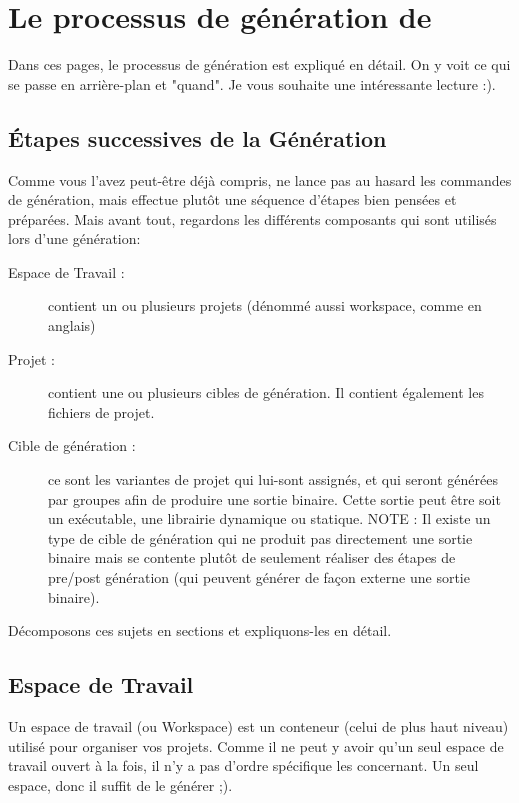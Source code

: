 \section{Le processus de génération de \codeblocks}\label{sec:build_process}

Dans ces pages, le processus de génération est expliqué en détail. On y voit ce qui se passe en arrière-plan et "quand". Je vous souhaite une intéressante lecture :).
 
\subsection{Étapes successives de la Génération}

Comme vous l'avez peut-être déjà compris, \codeblocks ne lance pas au hasard les commandes de génération, mais effectue plutôt une séquence d'étapes bien pensées et préparées. Mais avant tout, regardons les différents composants qui sont utilisés lors d'une génération:

\begin{description}
\item [Espace de Travail :] contient un ou plusieurs projets (dénommé aussi workspace, comme en anglais)
\item [Projet :] contient une ou plusieurs cibles de génération. Il contient également les fichiers de projet.
\item [Cible de génération :] ce sont les variantes de projet qui lui-sont assignés, et qui seront générées par groupes afin de produire une sortie binaire. Cette sortie peut être soit un exécutable, une librairie  dynamique ou statique. NOTE : Il existe un type de cible de génération qui ne produit pas directement une sortie binaire mais se contente plutôt de seulement réaliser des étapes de pre/post génération (qui peuvent générer de façon externe une sortie binaire).
\end{description}

Décomposons ces sujets en sections et expliquons-les en détail.

\subsection{Espace de Travail}

Un espace de travail (ou Workspace) est un conteneur (celui de plus haut niveau) utilisé pour organiser vos projets. Comme il ne peut y avoir qu'un seul espace de travail ouvert à la fois, il n'y a pas d'ordre spécifique les concernant. Un seul espace, donc il suffit de le générer ;).

